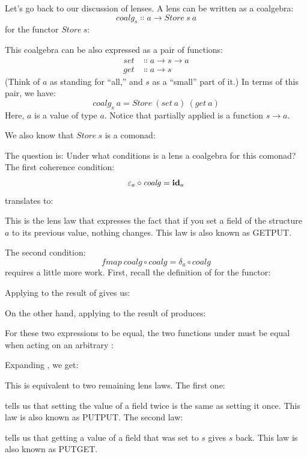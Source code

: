 Let's go back to our discussion of lenses. A lens can be written as a
coalgebra:
\[\mathit{coalg}_s \Colon a \to \mathit{Store}\ s\ a\]
for the functor $\mathit{Store}\ s$:

This coalgebra can be also expressed as a pair of functions:
\[
	\begin{aligned}
		\mathit{set} & \Colon a \to s \to a \\
		\mathit{get} & \Colon a \to s
	\end{aligned}
\]
(Think of $a$ as standing for ``all,'' and $s$ as a
``small'' part of it.) In terms of this pair, we have:
\[\mathit{coalg}_s\ a = \mathit{Store}\ (\mathit{set}\ a)\ (\mathit{get}\ a)\]
Here, $a$ is a value of type $a$. Notice that partially
applied  is a function $s \to a$.

We also know that $\mathit{Store}\ s$ is a comonad:

The question is: Under what conditions is a lens a coalgebra for this
comonad? The first coherence condition:
\[\varepsilon_a \circ \mathit{coalg} = \idarrow[a]\]
translates to:

This is the lens law that expresses the fact that if you set a field of
the structure $a$ to its previous value, nothing changes.
This law is also known as GETPUT.

The second condition:
\[\mathit{fmap}\ \mathit{coalg} \circ \mathit{coalg} = \delta_a \circ \mathit{coalg}\]
requires a little more work. First, recall the definition of
 for the  functor:

Applying  to the result of  gives us:

On the other hand, applying  to the result of
 produces:

For these two expressions to be equal, the two functions under
 must be equal when acting on an arbitrary :

Expanding , we get:

This is equivalent to two remaining lens laws. The first one:

tells us that setting the value of a field twice is the same as setting
it once. This law is also known as PUTPUT. The second law:

tells us that getting a value of a field that was set to $s$
gives $s$ back. This law is also known as PUTGET.

